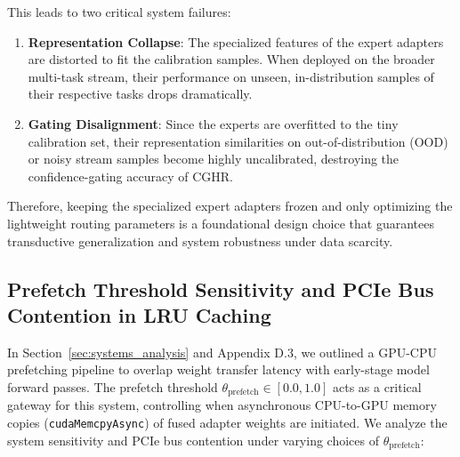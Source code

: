 \documentclass{article}
\theoremstyle{plain}
\theoremstyle{definition}
\theoremstyle{remark}
\begin{document}
This leads to two critical system failures:
\begin{enumerate}
    \item \textbf{Representation Collapse}: The specialized features of the expert adapters are distorted to fit the calibration samples. When deployed on the broader multi-task stream, their performance on unseen, in-distribution samples of their respective tasks drops dramatically.
    \item \textbf{Gating Disalignment}: Since the experts are overfitted to the tiny calibration set, their representation similarities on out-of-distribution (OOD) or noisy stream samples become highly uncalibrated, destroying the confidence-gating accuracy of CGHR.
\end{enumerate}
Therefore, keeping the specialized expert adapters frozen and only optimizing the lightweight routing parameters is a foundational design choice that guarantees transductive generalization and system robustness under data scarcity.

\subsection{Prefetch Threshold Sensitivity and PCIe Bus Contention in LRU Caching}
\label{app:prefetch_sensitivity}
In Section~\ref{sec:systems_analysis} and Appendix D.3, we outlined a GPU-CPU prefetching pipeline to overlap weight transfer latency with early-stage model forward passes. The prefetch threshold $\theta_{\text{prefetch}} \in [0.0, 1.0]$ acts as a critical gateway for this system, controlling when asynchronous CPU-to-GPU memory copies (\texttt{cudaMemcpyAsync}) of fused adapter weights are initiated. We analyze the system sensitivity and PCIe bus contention under varying choices of $\theta_{\text{prefetch}}$:
\end{document}
